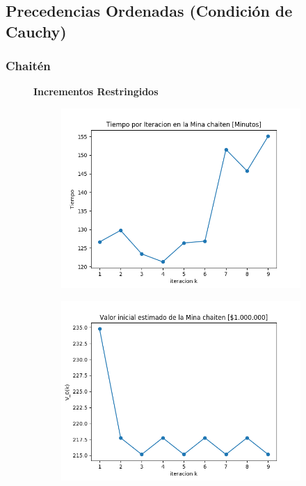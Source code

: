 \documentclass[12pt,letterpaper]{article}
\begin{document}
\subsection{Precedencias Ordenadas (Condición de Cauchy)}

\subsubsection{Chaitén}

\begin{figure}[H]
  \captionsetup[subfigure]{labelformat=empty}
  \centering
  \textbf{Incrementos Restringidos}
  
  \begin{subfigure}[b]{0.4\textwidth}
     \includegraphics[width=\textwidth]{Graficos/FiltradosCauchyRestringidos/chaiten_inc_times..png}
     \caption{}
     \label{fig:ex1}
  \end{subfigure}
  \begin{subfigure}[b]{0.4\textwidth}
     \includegraphics[width=\textwidth]{Graficos/FiltradosCauchyRestringidos/chaiten_inc_v_k..png}
     \caption{}
     \label{fig:ex2}
  \end{subfigure}
\end{figure}
\end{document}
